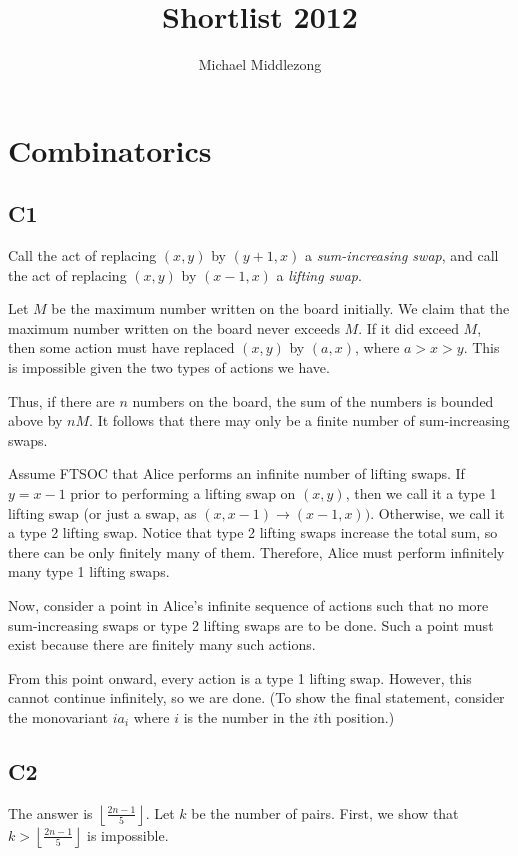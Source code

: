 \documentclass{scrartcl}
\title{Shortlist 2012}
\author{Michael Middlezong}
\begin{document}
\maketitle

\section*{Combinatorics}
\subsection*{C1}
Call the act of replacing $(x,y)$ by $(y+1,x)$ a \textit{sum-increasing swap}, and call the act of replacing $(x,y)$ by $(x-1,x)$ a \textit{lifting swap}.

Let $M$ be the maximum number written on the board initially.
We claim that the maximum number written on the board never exceeds $M$.
If it did exceed $M$, then some action must have replaced $(x,y)$ by $(a,x)$, where $a > x > y$.
This is impossible given the two types of actions we have.

Thus, if there are $n$ numbers on the board, the sum of the numbers is bounded above by $nM$.
It follows that there may only be a finite number of sum-increasing swaps.

Assume FTSOC that Alice performs an infinite number of lifting swaps.
If $y = x - 1$ prior to performing a lifting swap on $(x,y)$, then we call it a type 1 lifting swap (or just a swap, as $(x,x-1) \to (x-1,x))$.
Otherwise, we call it a type 2 lifting swap.
Notice that type 2 lifting swaps increase the total sum, so there can be only finitely many of them.
Therefore, Alice must perform infinitely many type 1 lifting swaps.

Now, consider a point in Alice's infinite sequence of actions such that no more sum-increasing swaps or type 2 lifting swaps are to be done.
Such a point must exist because there are finitely many such actions.

From this point onward, every action is a type 1 lifting swap.
However, this cannot continue infinitely, so we are done.
(To show the final statement, consider the monovariant $ia_i$ where $i$ is the number in the $i$th position.)

\subsection*{C2}
The answer is $\left\lfloor \frac{2n-1}{5} \right\rfloor$.
Let $k$ be the number of pairs.
First, we show that $k > \left\lfloor \frac{2n-1}{5} \right\rfloor$ is impossible.
\end{document}
